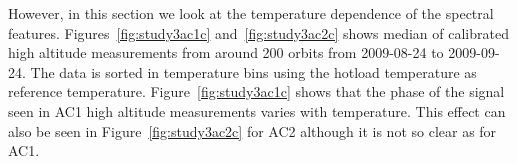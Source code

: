 However, in this section we look at the temperature dependence
of the spectral features. Figures~\ref{fig:study3ac1c} and~\ref{fig:study3ac2c}
shows median of calibrated high altitude measurements from around 
200 orbits from 2009-08-24 to 2009-09-24. 
The data is sorted in temperature bins using the hotload temperature
as reference temperature.   
Figure~\ref{fig:study3ac1c} shows that the phase of the signal seen in AC1 
high altitude measurements varies with temperature.
This effect can also be seen in Figure~\ref{fig:study3ac2c} for AC2
although it is not so clear as for AC1.






